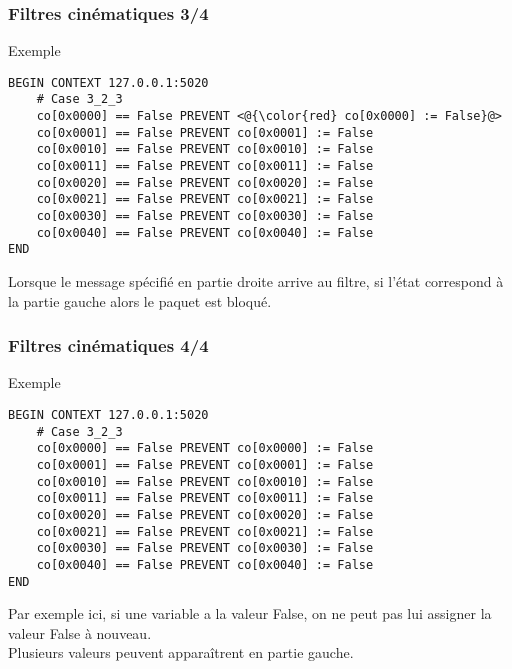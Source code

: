 \documentclass{beamer}
\begin{document}
\begin{frame}[fragile]
    \frametitle{Filtres cinématiques 3/4}

    \begin{exampleblock}{Exemple}
        \begin{lstlisting}
BEGIN CONTEXT 127.0.0.1:5020
    # Case 3_2_3
    co[0x0000] == False PREVENT <@{\color{red} co[0x0000] := False}@>
    co[0x0001] == False PREVENT co[0x0001] := False
    co[0x0010] == False PREVENT co[0x0010] := False
    co[0x0011] == False PREVENT co[0x0011] := False
    co[0x0020] == False PREVENT co[0x0020] := False
    co[0x0021] == False PREVENT co[0x0021] := False
    co[0x0030] == False PREVENT co[0x0030] := False
    co[0x0040] == False PREVENT co[0x0040] := False
END
        \end{lstlisting}
    \end{exampleblock}
    \vfill
    Lorsque le message spécifié en partie droite arrive au filtre,
    si l'état correspond à la partie gauche alors le paquet est bloqué.\\
\end{frame}

\begin{frame}[fragile]
    \frametitle{Filtres cinématiques 4/4}

    \begin{exampleblock}{Exemple}
        \begin{lstlisting}
BEGIN CONTEXT 127.0.0.1:5020
    # Case 3_2_3
    co[0x0000] == False PREVENT co[0x0000] := False
    co[0x0001] == False PREVENT co[0x0001] := False
    co[0x0010] == False PREVENT co[0x0010] := False
    co[0x0011] == False PREVENT co[0x0011] := False
    co[0x0020] == False PREVENT co[0x0020] := False
    co[0x0021] == False PREVENT co[0x0021] := False
    co[0x0030] == False PREVENT co[0x0030] := False
    co[0x0040] == False PREVENT co[0x0040] := False
END
        \end{lstlisting}
    \end{exampleblock}
    \vfill
    Par exemple ici, si une variable a la valeur {\sf False}, on ne peut pas lui assigner
    la valeur {\sf False} à nouveau.\\
    Plusieurs valeurs peuvent apparaîtrent en partie gauche.
\end{frame}
\end{document}
